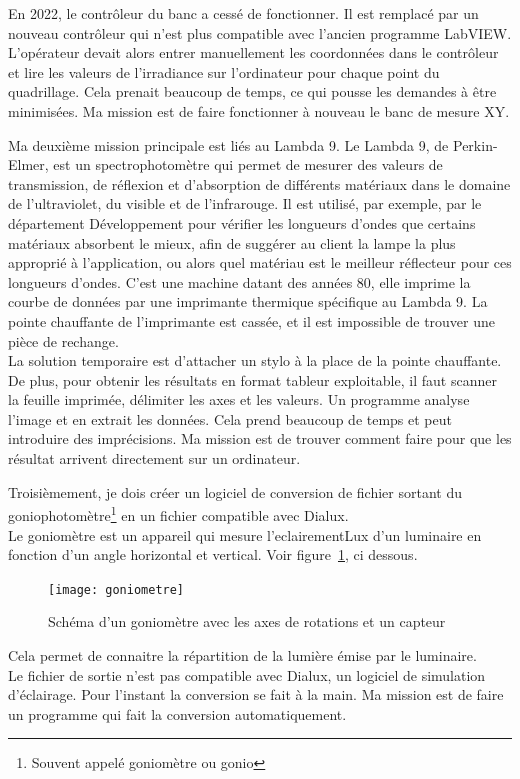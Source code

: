 \documentclass[12pt]{article}
\begin{document}
En 2022, le contrôleur du banc a cessé de fonctionner.
Il est remplacé par un nouveau contrôleur qui n'est plus compatible avec l'ancien programme LabVIEW.\\
L'opérateur devait alors entrer manuellement les coordonnées dans le contrôleur et lire les valeurs de l'irradiance sur l'ordinateur pour chaque point du quadrillage.
Cela prenait beaucoup de temps, ce qui pousse les demandes à être minimisées.
Ma mission est de faire fonctionner à nouveau le banc de mesure XY.


Ma deuxième mission principale est liés au Lambda 9.
Le Lambda 9, de Perkin-Elmer, est un spectrophotomètre qui permet de mesurer des valeurs de transmission, de réflexion et d'absorption de différents matériaux dans le domaine de l'ultraviolet, du visible et de l'infrarouge.
Il est utilisé, par exemple, par le département Développement pour vérifier les longueurs d'ondes que certains matériaux absorbent le mieux, afin de suggérer au client la lampe la plus approprié à l'application, ou alors quel matériau est le meilleur réflecteur pour ces longueurs d'ondes.
C'est une machine datant des années 80, elle imprime la courbe de données par une imprimante thermique spécifique au Lambda 9.
La pointe chauffante de l'imprimante est cassée, et il est impossible de trouver une pièce de rechange.\\
La solution temporaire est d'attacher un stylo à la place de la pointe chauffante.
De plus, pour obtenir les résultats en format tableur exploitable, il faut scanner la feuille imprimée, délimiter les axes et les valeurs. Un programme analyse l'image et en extrait les données.
Cela prend beaucoup de temps et peut introduire des imprécisions.
Ma mission est de trouver comment faire pour que les résultat arrivent directement sur un ordinateur.



Troisièmement, je dois créer un logiciel de conversion de fichier sortant du goniophotomètre\footnote{Souvent appelé goniomètre ou gonio} en un fichier compatible avec Dialux.\\
Le goniomètre est un appareil qui mesure l'\gls{eclairementLux} d'un luminaire en fonction d'un angle horizontal et vertical.
Voir figure~\ref{fig:gonio}, ci dessous.
\begin{figure}[H]
	\centering
	\texttt{[image: goniometre]}
	\caption{Schéma d'un goniomètre avec les axes de rotations et un capteur}
	\label{fig:gonio}
\end{figure}
Cela permet de connaitre la répartition de la lumière émise par le luminaire.\\
Le fichier de sortie n'est pas compatible avec Dialux, un logiciel de simulation d'éclairage.
Pour l'instant la conversion se fait à la main. 
Ma mission est de faire un programme qui fait la conversion automatiquement.
\end{document}
